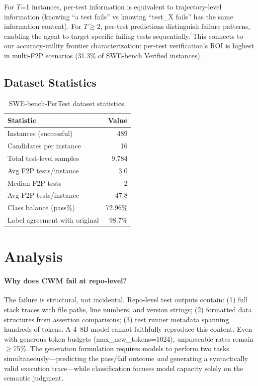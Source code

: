 \documentclass[11pt]{article}
\begin{document}
For $T$=1 instances, per-test information is equivalent to trajectory-level information (knowing ``a test fails'' vs knowing ``test\_X fails'' has the same information content). For $T \geq 2$, per-test predictions distinguish failure patterns, enabling the agent to target specific failing tests sequentially. This connects to our accuracy-utility frontier characterization: per-test verification's ROI is highest in multi-F2P scenarios (31.3\% of SWE-bench Verified instances).

\subsection{Dataset Statistics}
\label{sec:dataset}

\begin{table}[h]
\centering
\caption{SWE-bench-PerTest dataset statistics.}
\label{tab:dataset}
\begin{tabular}{lr}
\toprule
Statistic & Value \\
\midrule
Instances (successful) & 489 \\
Candidates per instance & 16 \\
Total test-level samples & 9,784 \\
Avg F2P tests/instance & 3.0 \\
Median F2P tests & 2 \\
Avg P2P tests/instance & 47.8 \\
Class balance (pass\%) & 72.96\% \\
Label agreement with original & 98.7\% \\
\bottomrule
\end{tabular}
\end{table}

\section{Analysis}

\paragraph{Why does CWM fail at repo-level?} The failure is structural, not incidental. Repo-level test outputs contain: (1) full stack traces with file paths, line numbers, and version strings; (2) formatted data structures from assertion comparisons; (3) test runner metadata spanning hundreds of tokens. A 4--8B model cannot faithfully reproduce this content. Even with generous token budgets (max\_new\_tokens=1024), unparseable rates remain $\geq$75\%. The generation formulation requires models to perform two tasks simultaneously---predicting the pass/fail outcome \emph{and} generating a syntactically valid execution trace---while classification focuses model capacity solely on the semantic judgment.
\end{document}
